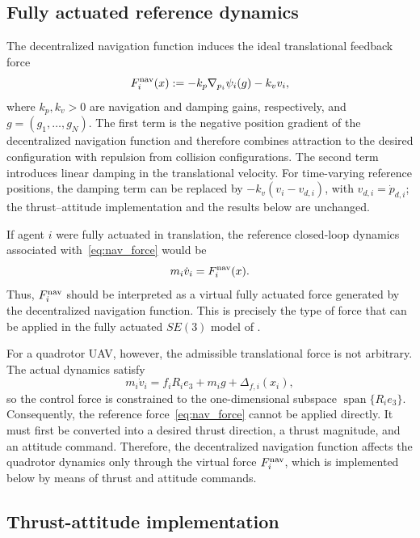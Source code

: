 \documentclass[journal,twoside,web]{ieeecolor}
\begin{document}
\subsection{Fully actuated reference dynamics}

The decentralized navigation function induces the ideal
translational feedback force
\begin{equation}
    F_i^{\rm nav}(x)
    :=
    -k_p\nabla_{p_i}\psi_i(g)
    -
    k_v v_i,
    \label{eq:nav_force}
\end{equation}
where $k_p,k_v>0$ are navigation and damping gains,
respectively, and $g=(g_1,\ldots,g_N)$. The first term is the
negative position gradient of the decentralized navigation
function and therefore combines attraction to the desired
configuration with repulsion from collision configurations.
The second term introduces linear damping in the translational
velocity. For time-varying reference positions, the damping term can be
replaced by $-k_v(v_i-v_{d,i})$, with $v_{d,i}=\dot p_{d,i}$;
the thrust--attitude implementation and the results below are
unchanged.

If agent $i$ were fully actuated in translation, the reference
closed-loop dynamics associated with~\eqref{eq:nav_force}
would be
\begin{equation}
    m_i\dot v_i
    =
    F_i^{\rm nav}(x).
    \label{eq:fully_actuated_reference}
\end{equation}
Thus, $F_i^{\rm nav}$ should be interpreted as a virtual
fully actuated force generated by the decentralized navigation
function. This is precisely the type of force that can be
applied in the fully actuated $SE(3)$ model of
\cite{YagoNietoSimoesGiribetColombo2026DNFSE3Learning}.

For a quadrotor UAV, however, the admissible translational
force is not arbitrary. The actual dynamics satisfy
\[
    m_i\dot v_i
    =
    f_iR_ie_3+m_ig+\Delta_{f,i}(x_i),
\]
so the control force is constrained to the one-dimensional
subspace $\operatorname{span}\{R_ie_3\}$. Consequently,
the reference force~\eqref{eq:nav_force} cannot be applied
directly. It must first be converted into a desired thrust
direction, a thrust magnitude, and an attitude command. Therefore, the decentralized navigation function affects the
quadrotor dynamics only through the virtual force
$F_i^{\rm nav}$, which is implemented below by means of
thrust and attitude commands.

\subsection{Thrust-attitude implementation}
\end{document}
